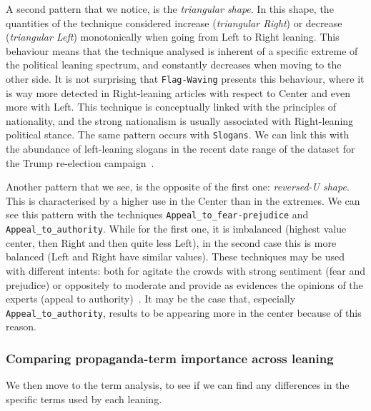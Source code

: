 A second pattern that we notice, is the \emph{triangular shape}. In this shape, the quantities of the technique considered increase (\emph{triangular Right}) or decrease (\emph{triangular Left}) monotonically when going from Left to Right leaning.
This behaviour means that the technique analysed is inherent of a specific extreme of the political leaning spectrum, and constantly decreases when moving to the other side.
It is not surprising that \texttt{Flag-Waving} presents this behaviour, where it is way more detected in Right-leaning articles with respect to Center and even more with Left. This technique is conceptually linked with the principles of nationality, and the strong nationalism is usually associated with Right-leaning political stance.
The same pattern occurs with \texttt{Slogans}. We can link this with the abundance of left-leaning slogans in the recent date range of the dataset for the Trump re-election campaign~\citep{jiang2020political}.

Another pattern that we see, is the opposite of the first one: \emph{reversed-U shape}. This is characterised by a higher use in the Center than in the extremes.
We can see this pattern with the techniques \texttt{Appeal\_to\_fear-prejudice} and \texttt{Appeal\_to\_authority}. While for the first one, it is imbalanced (highest value center, then Right and then quite less Left), in the second case this is more balanced (Left and Right have similar values).
These techniques may be used with different intents: both for agitate the crowds with strong sentiment (fear and prejudice) or oppositely to moderate and provide as evidences the opinions of the experts (appeal to authority)~\citep{walton2010appeal}. It may be the case that, especially \texttt{Appeal\_to\_authority}, results to be appearing more in the center because of this reason.

\subsubsection{Comparing propaganda-term importance across leaning}
We then move to the term analysis, to see if we can find any differences in the specific terms used by each leaning.



